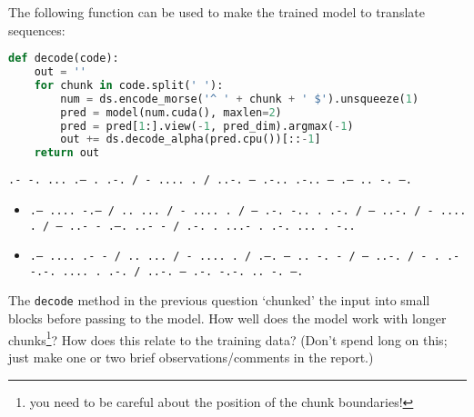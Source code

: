 \documentclass[a4paper]{article}
\begin{document}
\begin{tcolorbox}[title=1.2 now use it! (2 marks)]

The following function can be used to make the trained model to translate sequences:
\begin{lstlisting}[language=python]
def decode(code):
    out = ''
    for chunk in code.split(' '):
        num = ds.encode_morse('^ ' + chunk + ' $').unsqueeze(1)
        pred = model(num.cuda(), maxlen=2)
        pred = pred[1:].view(-1, pred_dim).argmax(-1)
        out += ds.decode_alpha(pred.cpu())[::-1]
    return out
\end{lstlisting}

\texttt{.- -. ... .-- . .-. / - .... . / ..-. --- .-.. .-.. --- .-- .. -. --.}
\begin{itemize}
	\item \texttt{.-- .... -.-- / .. ... / - .... . / --- .-. -.. . .-. / --- ..-. / - .... . / --- ..- - .--. ..- - / .-. . ...- . .-. ... . -..}
	\item \texttt{.-- .... .- - / .. ... / - .... . / .--. --- .. -. - / --- ..-. / - . .- -.-. .... . .-. / ..-. --- .-. -.-. .. -. --.}
\end{itemize}

\end{tcolorbox}

\begin{tcolorbox}[title=1.3 Sequence Lengths (1 mark)]
The \verb|decode| method in the previous question `chunked' the input into small blocks before passing to the model. How well does the model work with longer chunks\footnote{you need to be careful about the position of the chunk boundaries!}? How does this relate to the training data? (Don't spend long on this; just make one or two brief observations/comments in the report.)
\end{tcolorbox}
\end{document}
